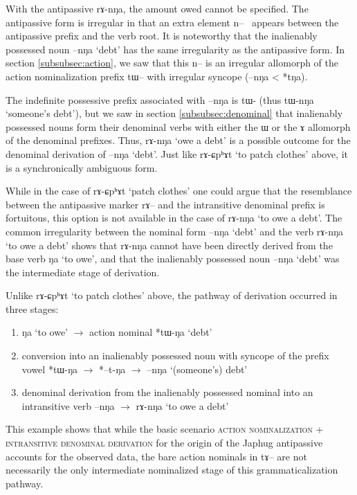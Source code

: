 \documentclass[oldfontcommands,oneside,a4paper,11pt]{article}
\newcommand{\ipa}[1]{{\phon \mbox{#1}}} %
\begin{document}
With the antipassive  \ipa{rɤ-nŋa}, the amount owed cannot be specified. The antipassive form is irregular in that  an extra element \ipa{n-- } appears between the antipassive prefix and the verb root. It is noteworthy that the  inalienably possessed noun \ipa{--nŋa} `debt'  has the same irregularity as the antipassive form. In section \ref{subsubsec:action}, we saw that this \ipa{n}-- is an irregular allomorph of the action nominalization prefix \ipa{tɯ}-- with irregular syncope (\ipa{--nŋa} < *\ipa{tŋa}).

The indefinite possessive prefix associated with \ipa{--nŋa} is \ipa{tɯ-} (thus \ipa{tɯ-nŋa} `someone's debt'), but we saw in section \ref{subsubsec:denominal} that inalienably possessed nouns form their denominal verbs with either the \ipa{ɯ} or the \ipa{ɤ} allomorph of the denominal prefixes. Thus, \ipa{rɤ-nŋa} `owe a debt' is a possible outcome for the denominal derivation of \ipa{--nŋa} `debt'. Just like \ipa{rɤ-ɕpʰɤt} `to patch clothes' above, it is a synchronically ambiguous form.

While in the case of \ipa{rɤ-ɕpʰɤt} `patch clothes' one could argue that the resemblance between the antipassive marker \ipa{rɤ}-- and the intransitive denominal prefix is fortuitous, this option is not available in the case of \ipa{rɤ-nŋa} `to owe a debt'.  The common irregularity between the nominal form \ipa{--nŋa} `debt' and the verb \ipa{rɤ-nŋa} `to owe a debt' shows that \ipa{rɤ-nŋa} cannot have been  directly derived from the base verb \ipa{ŋa} `to owe', and that the inalienably possessed noun   \ipa{--nŋa} `debt' was the intermediate stage of derivation.  
 
 Unlike \ipa{rɤ-ɕpʰɤt} `to patch clothes' above, the pathway of derivation occurred in three stages:
 
 \begin{enumerate}
\item \ipa{ŋa} `to owe'  $\rightarrow$ action nominal *\ipa{tɯ-ŋa} `debt'
\item conversion into an inalienably possessed noun with syncope of the prefix vowel *\ipa{tɯ-ŋa} $\rightarrow$ *\ipa{--t-ŋa} $\rightarrow$ \ipa{--nŋa} `(someone's) debt'
\item denominal derivation from the inalienably possessed nominal into an intransitive verb \ipa{--nŋa} $\rightarrow$ \ipa{rɤ-nŋa} `to owe a debt'
\end{enumerate}


This example shows that while the basic scenario \textsc{action nominalization} + \textsc{intransitive denominal derivation} for the origin of the Japhug antipassive accounts for the observed data, the bare action nominals in \ipa{tɤ}-- are not necessarily the only intermediate nominalized stage of this grammaticalization pathway.
\end{document}
